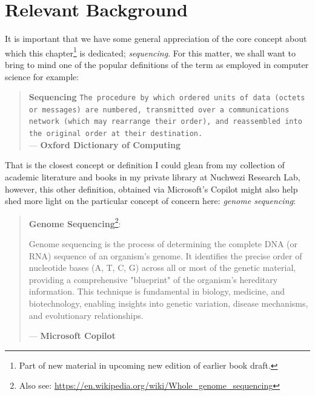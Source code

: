 \documentclass[a4paper, 18pt]{article} %
\begin{document}
\section{Relevant Background}


It is important that we have some general appreciation of the core concept about which this chapter\footnote{Part of new material in upcoming new edition of earlier book draft\cite{lutalo_2025_trans_genetics}.} is dedicated; \textit{sequencing}. For this matter, we shall want to bring to mind one of the popular definitions of the term as employed in computer science for example:


\begin{quotation}
\noindent \textbf{Sequencing} \texttt{The procedure by which ordered units of data (octets or messages) are numbered, transmitted over a communications network (which may rearrange their order), and reassembled into the original order at their destination.}\\
\hspace*{\fill} --- \textbf{Oxford Dictionary of Computing}\cite{illingworth1996computing}
\end{quotation}


That is the closest concept or definition I could glean from my collection of academic literature and books in my private library at Nuchwezi Research Lab, however, this other definition, obtained via Microsoft's Copilot might also help shed more light on the particular concept of concern here: \textit{genome sequencing}:

\begin{quotation}
\noindent \textbf{Genome Sequencing}\footnote{Also see: \url{https://en.wikipedia.org/wiki/Whole_genome_sequencing}}\cite{CDC2024GenomicSequencing}: {\ttfamily Genome sequencing is the process of determining the complete DNA (or RNA) sequence of an organism’s genome. It identifies the precise order of nucleotide bases (A, T, C, G) across all or most of the genetic material, providing a comprehensive "blueprint" of the organism's hereditary information. This technique is fundamental in biology, medicine, and biotechnology, enabling insights into genetic variation, disease mechanisms, and evolutionary relationships.

}
\hspace*{\fill} --- \textbf{Microsoft Copilot}\cite{copilot_dna_assistant}
\end{quotation}
\end{document}
